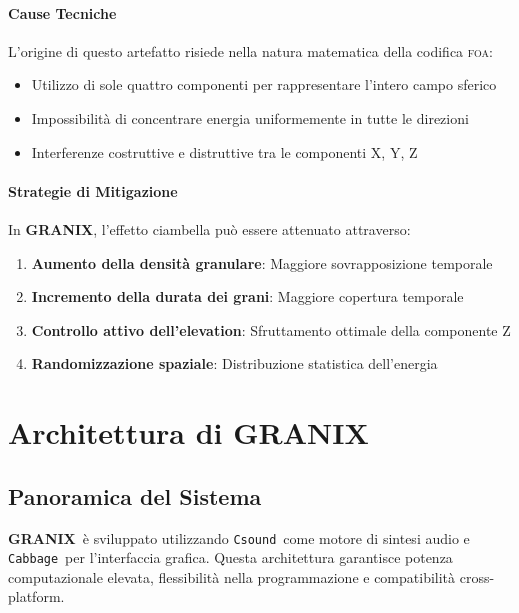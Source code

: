 \documentclass[a4paper,11pt,openany]{book}
\newcommand{\granix}{\textbf{\textcolor{granixblue}{GRANIX}}}
\newcommand{\foa}{\textsc{foa}}
\newcommand{\csound}{\texttt{Csound}}
\newcommand{\cabbage}{\texttt{Cabbage}}
\begin{document}
\subsubsection{Cause Tecniche}

L'origine di questo artefatto risiede nella natura matematica della codifica \foa:

\begin{itemize}
    \item Utilizzo di sole quattro componenti per rappresentare l'intero campo sferico
    \item Impossibilità di concentrare energia uniformemente in tutte le direzioni
    \item Interferenze costruttive e distruttive tra le componenti X, Y, Z
\end{itemize}

\subsubsection{Strategie di Mitigazione}

In \granix, l'effetto ciambella può essere attenuato attraverso:

\begin{enumerate}
    \item \textbf{Aumento della densità granulare}: Maggiore sovrapposizione temporale
    \item \textbf{Incremento della durata dei grani}: Maggiore copertura temporale
    \item \textbf{Controllo attivo dell'elevation}: Sfruttamento ottimale della componente Z
    \item \textbf{Randomizzazione spaziale}: Distribuzione statistica dell'energia
\end{enumerate}

\chapter{Architettura di \granix}

\section{Panoramica del Sistema}

\granix\ è sviluppato utilizzando \csound\ come motore di sintesi audio e \cabbage\ per l'interfaccia grafica. Questa architettura garantisce potenza computazionale elevata, flessibilità nella programmazione e compatibilità cross-platform.
\end{document}
